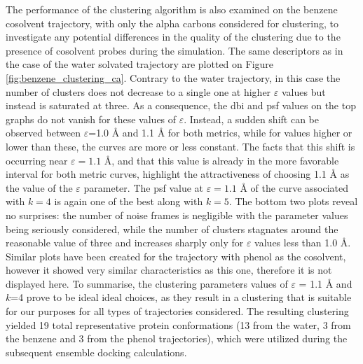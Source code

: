 The performance of the clustering algorithm is also examined on the benzene cosolvent trajectory, with only the alpha carbons considered for clustering, to investigate any potential differences in the quality of the clustering due to the presence of cosolvent probes during the simulation.
The same descriptors as in the case of the water solvated trajectory are plotted on Figure \ref{fig:benzene_clustering_ca}.
Contrary to the water trajectory, in this case the number of clusters does not decrease to a single one at higher $\varepsilon$ values but instead is saturated at three.
As a consequence, the \gls{dbi} and \gls{psf} values on the top graphs do not vanish for these values of $\varepsilon$.
Instead, a sudden shift can be observed between $\varepsilon$=1.0 \AA{} and 1.1 \AA{} for both metrics, while for values higher or lower than these, the curves are more or less constant.
The facts that this shift is occurring near $\varepsilon=1.1$ \AA{}, and that this value is already in the more favorable interval for both metric curves, highlight the attractiveness of choosing 1.1 \AA{} as the value of the $\varepsilon$ parameter.
The \gls{psf} value at $\varepsilon=1.1$ \AA{} of the curve associated with $k=4$ is again one of the best along with $k=5$.
The bottom two plots reveal no surprises: the number of noise frames is negligible with the parameter values being seriously considered, while the number of clusters stagnates around the reasonable value of three and increases sharply only for $\varepsilon$ values less than 1.0 \AA{}.
Similar plots have been created for the trajectory with phenol as the cosolvent, however it showed very similar characteristics as this one, therefore it is not displayed here.
To summarise, the clustering parameters values of $\varepsilon$ = 1.1 \AA{} and $k$=4 prove to be ideal ideal choices, as they result in a clustering that is suitable for our purposes for all types of trajectories considered.
The resulting clustering yielded 19 total representative protein conformations (13 from the water, 3 from the benzene and 3 from the phenol trajectories), which were utilized during the subsequent ensemble docking calculations.
